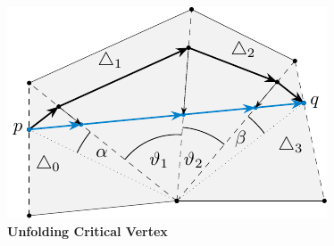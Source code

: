 \documentclass{stdlocal}
\begin{document}


  \begin{figure}
    \centering
    \includegraphics[width=0.5\linewidth]{figures/unfolding-critical-vertex.pdf}
    \caption[Unfolding Critical Vertex]{%
      \textbf{Unfolding Critical Vertex}\\
    }
  \end{figure}
\end{document}
